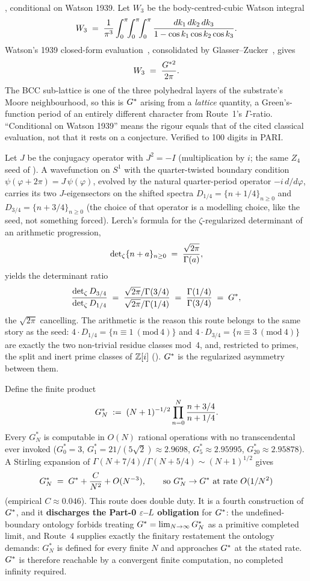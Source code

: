 , conditional on Watson 1939. Let $W_3$
be the body-centred-cubic Watson integral
\[ W_3 \;=\; \frac{1}{\pi^{3}}\int_0^{\pi}\!\!\int_0^{\pi}\!\!\int_0^{\pi} \frac{dk_1\,dk_2\,dk_3}{1 - \cos k_1 \cos k_2 \cos k_3}. \]
Watson's 1939 closed-form evaluation~\cite{watson1939}, consolidated by
Glasser--Zucker~\cite{glasserZucker1980}, gives
\[ W_3 \;=\; \frac{G^{*2}}{2\pi}. \]
The BCC sub-lattice is one of the three polyhedral layers of the substrate's
Moore neighbourhood, so this is $G^{*}$ arising from a \emph{lattice}
quantity, a Green's-function period of an entirely different character from
Route~1's $\Gamma$-ratio. ``Conditional on Watson 1939'' means the rigour equals
that of the cited classical evaluation, not that it rests on a conjecture.
Verified to 100 digits in PARI.

 Let $J$ be the
conjugacy operator with $J^2=-I$ (multiplication by $i$; the same $Z_4$ seed of
). A wavefunction on $S^1$ with the quarter-twisted boundary
condition $\psi(\varphi+2\pi)=J\,\psi(\varphi)$, evolved by the natural
quarter-period operator $-i\,d/d\varphi$, carries its two $J$-eigensectors on the
shifted spectra $D_{1/4}=\{n+1/4\}_{n\ge0}$ and $D_{3/4}=\{n+3/4\}_{n\ge0}$ (the
choice of that operator is a modelling choice, like the seed, not something
forced). Lerch's formula for the $\zeta$-regularized
determinant of an arithmetic progression,
\[ \operatorname{det}\nolimits_{\zeta}\{n + a\}_{n\ge 0} \;=\; \frac{\sqrt{2\pi}}{\Gamma(a)}, \]
yields the determinant ratio
\[ \frac{\operatorname{det}\nolimits_{\zeta} D_{3/4}}{\operatorname{det}\nolimits_{\zeta} D_{1/4}} \;=\; \frac{\sqrt{2\pi}/\Gamma(3/4)}{\sqrt{2\pi}/\Gamma(1/4)} \;=\; \frac{\Gamma(1/4)}{\Gamma(3/4)} \;=\; G^{*}, \]
the $\sqrt{2\pi}$ cancelling. The arithmetic is the reason this route belongs to
the same story as the seed: $4\cdot D_{1/4}=\{n\equiv1\ (\mathrm{mod}\ 4)\}$ and
$4\cdot D_{3/4}=\{n\equiv3\ (\mathrm{mod}\ 4)\}$ are exactly the two non-trivial
residue classes mod~4, and, restricted to primes, the split and inert prime
classes of $\mathbb{Z}[i]$ (). $G^{*}$ is the regularized asymmetry between
them.

 Define the finite product
\[ G^{*}_{N} \;:=\; (N+1)^{-1/2}\prod_{n=0}^{N}\frac{n + 3/4}{n + 1/4}. \]
Every $G^{*}_N$ is computable in $O(N)$ rational operations with no transcendental
ever invoked ($G^{*}_0=3$, $G^{*}_1=21/(5\sqrt2)\approx2.9698$,
$G^{*}_5\approx2.95995$, $G^{*}_{20}\approx2.95878$). A Stirling expansion of
$\Gamma(N+7/4)/\Gamma(N+5/4)\sim(N+1)^{1/2}$ gives
\[ G^{*}_{N} \;=\; G^{*} + \frac{C}{N^{2}} + O(N^{-3}), \qquad\text{so } G^{*}_{N} \to G^{*} \text{ at rate } O(1/N^{2}) \]
(empirical $C\approx0.046$). This route does double duty. It is a fourth
construction of $G^{*}$, and it \textbf{discharges the Part-0
$\varepsilon$--$L$ obligation} for $G^{*}$: the undefined-boundary ontology forbids
treating $G^{*}=\lim_{N\to\infty}G^{*}_N$ as a primitive completed limit, and
Route~4 supplies exactly the finitary restatement the ontology demands: $G^{*}_N$
is defined for every finite $N$ and approaches $G^{*}$ at the stated rate. $G^{*}$ is
therefore reachable by a convergent finite computation, no completed infinity
required.

